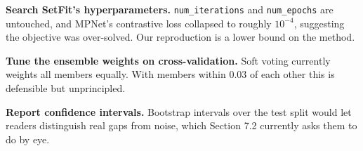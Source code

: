 \textbf{Search SetFit's hyperparameters.} \texttt{num\_iterations} and \texttt{num\_epochs} are untouched, and MPNet's contrastive loss collapsed to roughly $10^{-4}$, suggesting the objective was over-solved. Our reproduction is a lower bound on the method.

\textbf{Tune the ensemble weights on cross-validation.} Soft voting currently weights all members equally. With members within 0.03 of each other this is defensible but unprincipled.

\textbf{Report confidence intervals.} Bootstrap intervals over the test split would let readers distinguish real gaps from noise, which Section 7.2 currently asks them to do by eye.

